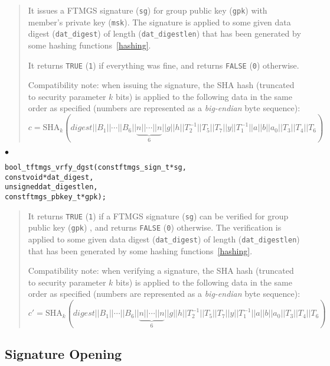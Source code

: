 \documentclass[a4paper]{article}
\newenvironment{api}%
{\noindent$\bullet$\hfill\begin{minipage}[t]{0.97\linewidth}\footnotesize\begin{alltt}}%
{\end{alltt}\end{minipage}}%
\begin{document}
\begin{quote}\footnotesize
It issues a FTMGS signature (\verb|sg|) for group public key
(\verb|gpk|) with member's private key (\verb|msk|). The signature is
applied to some given data digest (\verb|dat_digest|) of length
(\verb|dat_digestlen|) that has been generated by some hashing
functions~\ref{hashing}.

It returns \verb|TRUE| (\verb|1|) if everything was fine, and returns
\verb|FALSE| (\verb|0|) otherwise.

Compatibility note: when issuing the signature, the SHA hash
(truncated to security parameter $k$ bits) is applied to the following
data in the same order as specified (numbers are represented as a
\emph{big-endian} byte sequence):\\ {$c =
  \mathrm{SHA}_k(\mathit{digest}||B_1||\cdots||B_6||\underbrace{n||\cdots||n}_6||g||h||T_2^{-1}||T_5||T_7||y||T_1^{-1}||a||b||a_0||T_3||T_4||T_6)$}
\end{quote}
\begin{api}
bool_t ftmgs_vrfy_dgst(const ftmgs_sign_t* sg,
                       const void* dat_digest,
                       unsigned dat_digestlen,
                       const ftmgs_pbkey_t* gpk);
\end{api}
\begin{quote}\footnotesize
It returns \verb|TRUE| (\verb|1|) if a FTMGS signature (\verb|sg|) can
be verified for group public key (\verb|gpk|) , and returns
\verb|FALSE| (\verb|0|) otherwise. The verification is applied to some
given data digest (\verb|dat_digest|) of length (\verb|dat_digestlen|)
that has been generated by some hashing functions~\ref{hashing}.

Compatibility note: when verifying a signature, the SHA hash
(truncated to security parameter $k$ bits) is applied to the following
data in the same order as specified (numbers are represented as a
\emph{big-endian} byte sequence):\\ {$c' =
  \mathrm{SHA}_k(\mathit{digest}||B_1||\cdots||B_6||\underbrace{n||\cdots||n}_6||g||h||T_2^{-1}||T_5||T_7||y||T_1^{-1}||a||b||a_0||T_3||T_4||T_6)$}
\end{quote}
\subsection{Signature Opening}
\end{document}
